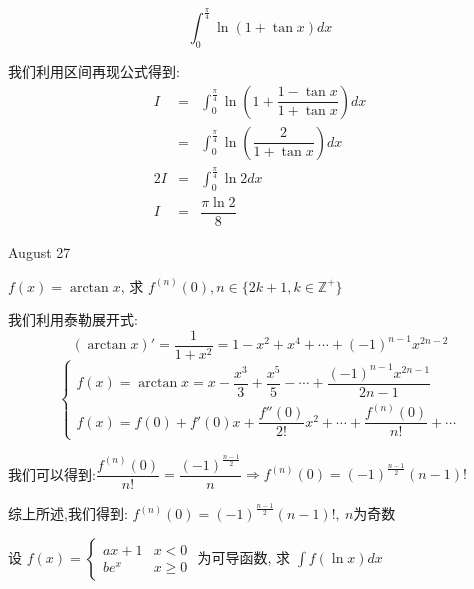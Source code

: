 \begin{example}[][Exam: 34.4.10]
	$$\int_{0}^{\frac{\pi}{4}}\ln(1+\tan x)dx$$
\end{example}

\begin{solution}

	我们利用区间再现公式得到:
	\begin{eqnarray*}
		I&=&\int_{0}^{\frac{\pi}{4}}\ln(1+\dfrac{1-\tan x}{1+\tan x})dx\\
		&=&\int_{0}^{\frac{\pi}{4}}\ln(\dfrac{2}{1+\tan x})dx\\
		2I&=&\int_{0}^{\frac{\pi}{4}}\ln2dx\\
		I&=&\dfrac{\pi \ln2}{8}
	\end{eqnarray*}
\end{solution}


\textcolor{purplea}{August 27}

\begin{example}[][Exam: 34.4.11]
	$f(x)=\arctan x$, 求 $f^{(n)}(0), n\in\{2k+1, k\in \mathbb{Z}^{+}\}$
\end{example}

\begin{solution}

	我们利用泰勒展开式:
	$$(\arctan x)'=\dfrac{1}{1+x^2}=1-x^2+x^4+\cdots+(-1)^{n-1}x^{2n-2}$$
	$$\left\lbrace
	\begin{array}{l}
		f(x)=\arctan x=x-\dfrac{x^3}{3}+\dfrac{x^5}{5}-\cdots+\dfrac{(-1)^{n-1}x^{2n-1}}{2n-1}\\
		f(x)=f(0)+f'(0)x+\dfrac{f''(0)}{2!}x^2+\cdots+\dfrac{f^{(n)}(0)}{n!}+\cdots
	\end{array}
	\right. $$
	
	我们可以得到:$\dfrac{f^{(n)}(0)}{n!}=\dfrac{(-1)^{\frac{n-1}{2}}}{n}\Rightarrow f^{(n)}(0)=(-1)^{\frac{n-1}{2}}(n-1)!$
		
	综上所述,我们得到:  $f^{(n)}(0)=(-1)^{\frac{n-1}{2}}(n-1)!,\ n\text{为奇数}$
\end{solution}

\begin{example}[][Exam: 34.4.12]
	设 $f(x)=
	\begin{cases}
		ax+1 & x<0\\
		be^x & x\geq 0
	\end{cases}$ 为可导函数, 求 $\int f(\ln x)dx$
\end{example}

